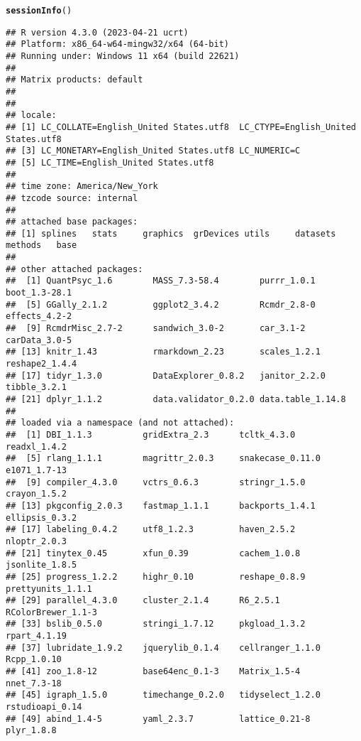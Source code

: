 \documentclass{article}\usepackage[]{graphicx}\usepackage[]{xcolor}
\makeatletter
\newcommand{\hlstd}[1]{\textcolor[rgb]{0.345,0.345,0.345}{#1}}%
\newcommand{\hlkwd}[1]{\textcolor[rgb]{0.737,0.353,0.396}{\textbf{#1}}}%
\newenvironment{kframe}{%
 \def\at@end@of@kframe{}%
 \ifinner\ifhmode%
  \def\at@end@of@kframe{\end{minipage}}%
  \begin{minipage}{\columnwidth}%
 \fi\fi%
 \def\FrameCommand##1{\hskip\@totalleftmargin \hskip-\fboxsep
 \colorbox{shadecolor}{##1}\hskip-\fboxsep
     \hskip-\linewidth \hskip-\@totalleftmargin \hskip\columnwidth}%
 \MakeFramed {\advance\hsize-\width
   \@totalleftmargin\z@ \linewidth\hsize
   \@setminipage}}%
 {\par\unskip\endMakeFramed%
 \at@end@of@kframe}
\newenvironment{knitrout}{}{} %
\makeatother
\begin{document}
\begin{knitrout}
\color{fgcolor}\begin{kframe}
\begin{alltt}
\hlkwd{sessionInfo}\hlstd{()}
\end{alltt}
\begin{verbatim}
## R version 4.3.0 (2023-04-21 ucrt)
## Platform: x86_64-w64-mingw32/x64 (64-bit)
## Running under: Windows 11 x64 (build 22621)
## 
## Matrix products: default
## 
## 
## locale:
## [1] LC_COLLATE=English_United States.utf8  LC_CTYPE=English_United States.utf8   
## [3] LC_MONETARY=English_United States.utf8 LC_NUMERIC=C                          
## [5] LC_TIME=English_United States.utf8    
## 
## time zone: America/New_York
## tzcode source: internal
## 
## attached base packages:
## [1] splines   stats     graphics  grDevices utils     datasets  methods   base     
## 
## other attached packages:
##  [1] QuantPsyc_1.6        MASS_7.3-58.4        purrr_1.0.1          boot_1.3-28.1       
##  [5] GGally_2.1.2         ggplot2_3.4.2        Rcmdr_2.8-0          effects_4.2-2       
##  [9] RcmdrMisc_2.7-2      sandwich_3.0-2       car_3.1-2            carData_3.0-5       
## [13] knitr_1.43           rmarkdown_2.23       scales_1.2.1         reshape2_1.4.4      
## [17] tidyr_1.3.0          DataExplorer_0.8.2   janitor_2.2.0        tibble_3.2.1        
## [21] dplyr_1.1.2          data.validator_0.2.0 data.table_1.14.8   
## 
## loaded via a namespace (and not attached):
##  [1] DBI_1.1.3          gridExtra_2.3      tcltk_4.3.0        readxl_1.4.2      
##  [5] rlang_1.1.1        magrittr_2.0.3     snakecase_0.11.0   e1071_1.7-13      
##  [9] compiler_4.3.0     vctrs_0.6.3        stringr_1.5.0      crayon_1.5.2      
## [13] pkgconfig_2.0.3    fastmap_1.1.1      backports_1.4.1    ellipsis_0.3.2    
## [17] labeling_0.4.2     utf8_1.2.3         haven_2.5.2        nloptr_2.0.3      
## [21] tinytex_0.45       xfun_0.39          cachem_1.0.8       jsonlite_1.8.5    
## [25] progress_1.2.2     highr_0.10         reshape_0.8.9      prettyunits_1.1.1 
## [29] parallel_4.3.0     cluster_2.1.4      R6_2.5.1           RColorBrewer_1.1-3
## [33] bslib_0.5.0        stringi_1.7.12     pkgload_1.3.2      rpart_4.1.19      
## [37] lubridate_1.9.2    jquerylib_0.1.4    cellranger_1.1.0   Rcpp_1.0.10       
## [41] zoo_1.8-12         base64enc_0.1-3    Matrix_1.5-4       nnet_7.3-18       
## [45] igraph_1.5.0       timechange_0.2.0   tidyselect_1.2.0   rstudioapi_0.14   
## [49] abind_1.4-5        yaml_2.3.7         lattice_0.21-8     plyr_1.8.8        

\end{verbatim}
\end{kframe}
\end{knitrout}
\end{document}
